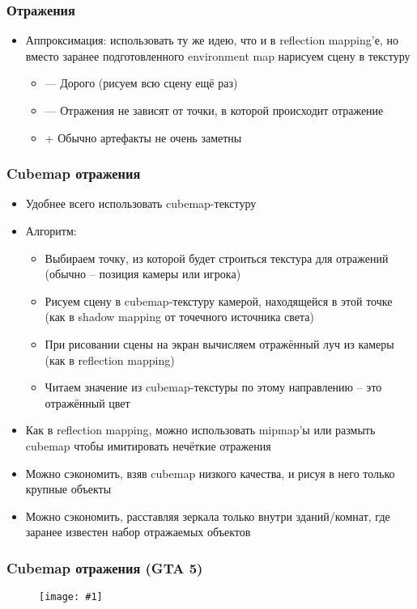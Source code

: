 \documentclass[10pt]{beamer}
\newcommand{\slideimage}[1]{
  \begin{figure}
    \begin{adjustbox}{width=\textwidth, totalheight=\textheight-2\baselineskip-2\baselineskip,keepaspectratio}
      \texttt{[image: \#1]}
    \end{adjustbox}
  \end{figure}
}
\begin{document}
\begin{frame}[fragile]
\frametitle{Отражения}
\begin{itemize}
\item Аппроксимация: использовать ту же идею, что и в reflection mapping'е, но вместо заранее подготовленного environment map нарисуем сцену в текстуру
\pause
\begin{itemize}
\item {\color{red}—} Дорого (рисуем всю сцену ещё раз)
\item {\color{red}—} Отражения не зависят от точки, в которой происходит отражение
\item {\color{green}+} Обычно артефакты не очень заметны
\end{itemize}
\end{itemize}
\end{frame}

\begin{frame}[fragile]
\frametitle{Cubemap отражения}
\begin{itemize}
\item Удобнее всего использовать cubemap-текстуру
\pause
\item Алгоритм:
\begin{itemize}
\item Выбираем точку, из которой будет строиться текстура для отражений (обычно -- позиция камеры или игрока)
\pause
\item Рисуем сцену в cubemap-текстуру камерой, находящейся в этой точке (как в shadow mapping от точечного источника света)
\pause
\item При рисовании сцены на экран вычисляем отражённый луч из камеры (как в reflection mapping)
\pause
\item Читаем значение из cubemap-текстуры по этому направлению -- это отражённый цвет
\end{itemize}
\pause
\item Как в reflection mapping, можно использовать mipmap'ы или размыть cubemap чтобы имитировать нечёткие отражения
\pause
\item Можно сэкономить, взяв cubemap низкого качества, и рисуя в него только крупные объекты
\pause
\item Можно сэкономить, расставляя зеркала только внутри зданий/комнат, где заранее известен набор отражаемых объектов
\end{itemize}
\end{frame}

\begin{frame}[fragile]
\frametitle{Cubemap отражения (GTA 5)}
\slideimage{gta_reflections.jpg}
\end{frame}
\end{document}
